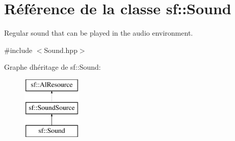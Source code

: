 \hypertarget{classsf_1_1Sound}{}\section{Référence de la classe sf\+:\+:Sound}
\label{classsf_1_1Sound}


Regular sound that can be played in the audio environment.  




{\ttfamily \#include $<$Sound.\+hpp$>$}

Graphe d\textquotesingle{}héritage de sf\+:\+:Sound\+:\begin{figure}[H]
\begin{center}
\leavevmode
\includegraphics[height=3.000000cm]{classsf_1_1Sound}
\end{center}
\end{figure}
